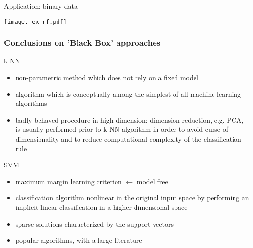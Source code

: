   \begin{frame}{Application: binary data}
    \begin{center}
    \texttt{[image: ex\_rf.pdf]}
  \end{center}
  \end{frame}

  \begin{frame}
  \frametitle{Conclusions on 'Black Box' approaches}

   \begin{block}{k-NN}
   \begin{itemize}
    \item non-parametric method which does not rely on a fixed model
    \item algorithm which is conceptually  among the simplest of all machine learning algorithms
    \item badly behaved procedure in high dimension: dimension reduction, e.g. PCA, is usually performed prior to k-NN algorithm in order to avoid curse of dimensionality and to reduce computational complexity of the classification rule
   \end{itemize}


   \end{block}


  \begin{block}{SVM}
  \begin{itemize}
   \item maximum margin learning criterion $\leftarrow$ model free
   \item classification algorithm nonlinear in the original input space by performing an implicit linear classification
   in a higher dimensional space
   \item sparse solutions characterized by the support vectors
   \item popular algorithms, with a large literature
    \end{itemize}
 \end{block}

\end{frame}



